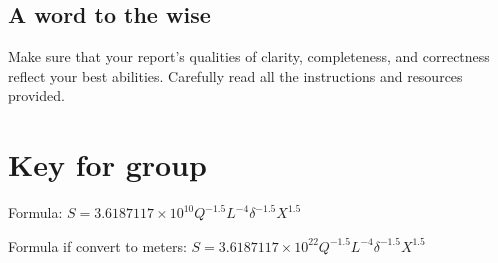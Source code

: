 \documentclass[11pt]{article}\usepackage[]{graphicx}\usepackage[]{color}
\begin{document}
\subsection*{A word to the wise}

Make sure that your report's qualities of clarity, completeness, and
correctness reflect your best abilities. Carefully read all the instructions
and resources provided.


\newpage

\section*{Key for group }



Formula: $S = \ensuremath{3.6187117\times 10^{10}} Q^{-1.5} L^{-4} \delta^{-1.5} X^{1.5}$

Formula if convert to meters: $S = \ensuremath{3.6187117\times 10^{22}} Q^{-1.5} L^{-4} \delta^{-1.5} X^{1.5}$

\end{document}

